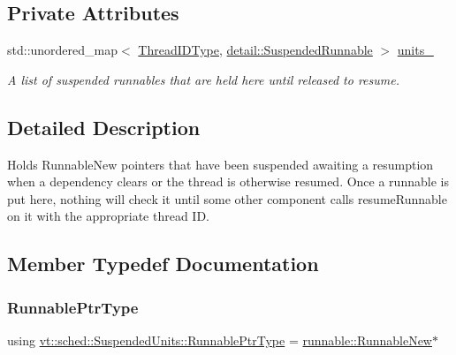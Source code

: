 \subsection*{Private Attributes}
\begin{DoxyCompactItemize}
\item 
std\+::unordered\+\_\+map$<$ \hyperlink{namespacevt_a9b887d814dd25ff495a0c8270304ac02}{Thread\+I\+D\+Type}, \hyperlink{structvt_1_1sched_1_1detail_1_1_suspended_runnable}{detail\+::\+Suspended\+Runnable} $>$ \hyperlink{structvt_1_1sched_1_1_suspended_units_a21eb59ab4bd3b27bbb5f2913a15b0d49}{units\+\_\+}
\begin{DoxyCompactList}\small\item\em A list of suspended runnables that are held here until released to resume. \end{DoxyCompactList}\end{DoxyCompactItemize}


\subsection{Detailed Description}
Holds {\ttfamily Runnable\+New} pointers that have been suspended awaiting a resumption when a dependency clears or the thread is otherwise resumed. Once a runnable is put here, nothing will check it until some other component calls {\ttfamily resume\+Runnable} on it with the appropriate thread ID. 

\subsection{Member Typedef Documentation}
\mbox{\label{structvt_1_1sched_1_1_suspended_units_a676693336c5e9f93da33338945a2ec6c}} 
\subsubsection{\texorpdfstring{Runnable\+Ptr\+Type}{RunnablePtrType}}
{\footnotesize\ttfamily using \hyperlink{structvt_1_1sched_1_1_suspended_units_a676693336c5e9f93da33338945a2ec6c}{vt\+::sched\+::\+Suspended\+Units\+::\+Runnable\+Ptr\+Type} =  \hyperlink{structvt_1_1runnable_1_1_runnable_new}{runnable\+::\+Runnable\+New}$\ast$}



